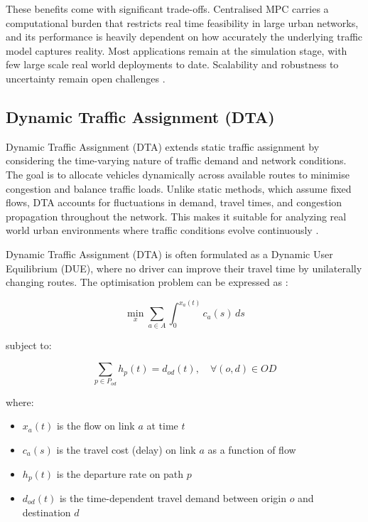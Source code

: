 ﻿\documentclass[11pt, a4paper]{report}
\begin{document}
These benefits come with significant trade-offs. Centralised MPC carries a computational burden that restricts real time feasibility in large urban networks, and its performance is heavily dependent on how accurately the underlying traffic model captures reality. Most applications remain at the simulation stage, with few large scale real world deployments to date. Scalability and robustness to uncertainty remain open challenges \cite{ye2019survey}.

\subsection{Dynamic Traffic Assignment (DTA)}

Dynamic Traffic Assignment (DTA) extends static traffic assignment by considering the time-varying nature of traffic demand and network conditions. The goal is to allocate vehicles dynamically across available routes to minimise congestion and balance traffic loads. Unlike static methods, which assume fixed flows, DTA accounts for fluctuations in demand, travel times, and congestion propagation throughout the network. This makes it suitable for analyzing real world urban environments where traffic conditions evolve continuously \cite{elimadi2024review}.

Dynamic Traffic Assignment (DTA) is often formulated as a Dynamic User Equilibrium (DUE), where no driver can improve their travel time by unilaterally changing routes. The optimisation problem can be expressed as \cite{elimadi2024review}:

\begin{equation}
\min_{x} \sum_{a \in A} \int_{0}^{x_a(t)} c_a(s)\,ds
\label{eq:dta-objective}
\end{equation}

subject to:

\begin{equation}
\sum_{p \in P_{od}} h_p(t) = d_{od}(t), \quad \forall (o,d) \in OD
\label{eq:dta-constraint}
\end{equation}

where:

\begin{itemize}
    \item $x_a(t)$ is the flow on link $a$ at time $t$
    \item $c_a(s)$ is the travel cost (delay) on link $a$ as a function of flow
    \item $h_p(t)$ is the departure rate on path $p$
    \item $d_{od}(t)$ is the time-dependent travel demand between origin $o$ and destination $d$
\end{itemize}
\end{document}
